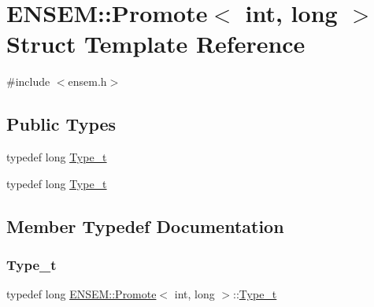 \hypertarget{structENSEM_1_1Promote_3_01int_00_01long_01_4}{}\section{E\+N\+S\+EM\+:\+:Promote$<$ int, long $>$ Struct Template Reference}
\label{structENSEM_1_1Promote_3_01int_00_01long_01_4}


{\ttfamily \#include $<$ensem.\+h$>$}

\subsection*{Public Types}
\begin{DoxyCompactItemize}
\item 
typedef long \mbox{\hyperlink{structENSEM_1_1Promote_3_01int_00_01long_01_4_a54e18c0fbe5235d06120945bf82c21e4}{Type\+\_\+t}}
\item 
typedef long \mbox{\hyperlink{structENSEM_1_1Promote_3_01int_00_01long_01_4_a54e18c0fbe5235d06120945bf82c21e4}{Type\+\_\+t}}
\end{DoxyCompactItemize}


\subsection{Member Typedef Documentation}
\mbox{\label{structENSEM_1_1Promote_3_01int_00_01long_01_4_a54e18c0fbe5235d06120945bf82c21e4}} 
\subsubsection{\texorpdfstring{Type\_t}{Type\_t}\hspace{0.1cm}{\footnotesize\ttfamily [1/2]}}
{\footnotesize\ttfamily typedef long \mbox{\hyperlink{structENSEM_1_1Promote}{E\+N\+S\+E\+M\+::\+Promote}}$<$ int, long $>$\+::\mbox{\hyperlink{structENSEM_1_1Promote_3_01int_00_01long_01_4_a54e18c0fbe5235d06120945bf82c21e4}{Type\+\_\+t}}}

\mbox{\label{structENSEM_1_1Promote_3_01int_00_01long_01_4_a54e18c0fbe5235d06120945bf82c21e4}} 
